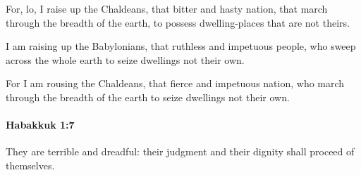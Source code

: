 			\begin{versebox}
					\item[BHS] 
					\item[LXX] 
					\item[ASV] For, lo, I raise up the Chaldeans, that bitter and hasty nation, that march through the breadth of the earth, to possess dwelling-places that are not theirs.
					\item[NIV] I am raising up the Babylonians, that ruthless and impetuous people, who sweep across the whole earth to seize dwellings not their own.
					\item[NRSV] For I am rousing the Chaldeans, that fierce and impetuous nation, who march through the breadth of the earth to seize dwellings not their own.
			\end{versebox}

		\paragraph{Habakkuk 1:7} %
			\label{HABAKKUK-1-7}

			They are terrible and dreadful: their judgment and their dignity shall proceed of themselves.

